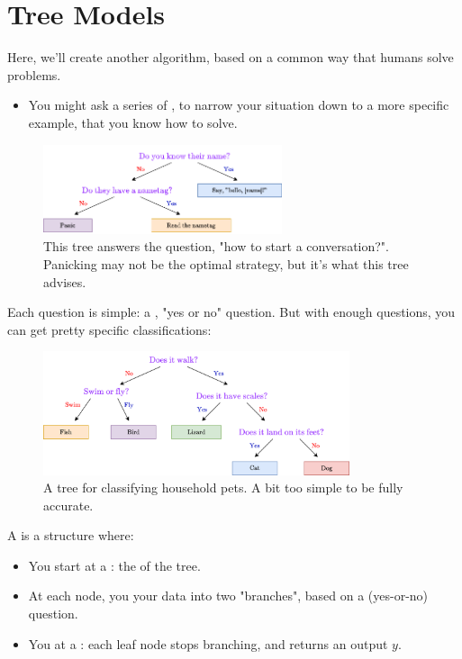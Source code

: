 \section{Tree Models}

    Here, we'll create another algorithm, based on a common way that humans solve problems.

    \begin{itemize}
        \item You might ask a series of , to narrow your situation down to a more specific example, that you know how to solve.
    \end{itemize}

    \begin{figure}[H]
        \centering
        \includegraphics[width=70mm,scale=0.5]{images/nonparametric_images/tree_simple.png}
        \caption*{This tree answers the question, "how to start a conversation?". Panicking may not be the optimal strategy, but it's what this tree advises.}
    \end{figure}

    Each question is simple: a , "yes or no" question. But with enough questions, you can get pretty specific classifications:

    \begin{figure}[H]
        \centering
        \includegraphics[width=90mm,scale=0.5]{images/nonparametric_images/tree_complex.png}
        \caption*{A tree for classifying household pets. A bit too simple to be fully accurate.}
    \end{figure}

    \begin{definition}
        A  is a structure where:

        \begin{itemize}
            \item You start at a : the  of the tree.
            
            \item At each node, you  your data into two "branches", based on a  (yes-or-no) question.

            \item You  at a : each leaf node stops branching, and returns an output $y$.
            
        \end{itemize}
    \end{definition}

